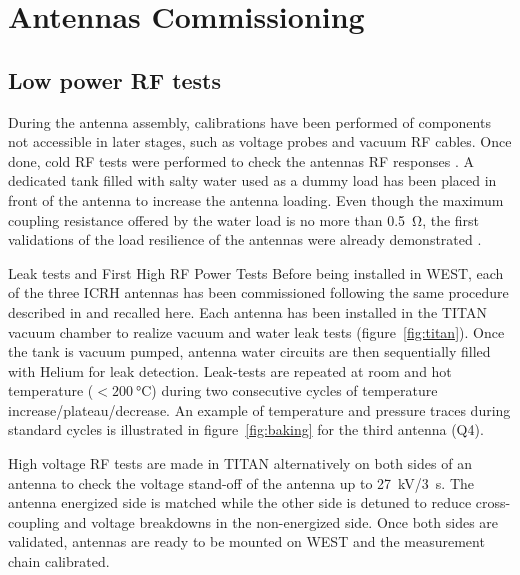 \documentclass[12p]{iopart}
\begin{document}
\section{Antennas Commissioning}
\subsection{Low power RF tests}
During the antenna assembly, calibrations have been performed of components not accessible in later stages, such as voltage probes and vacuum RF cables. Once done, cold RF tests were performed to check the antennas RF responses \cite{bernard2019, helou2020}. A dedicated tank filled with salty water used as a dummy load has been placed in front of the antenna to increase the antenna loading. Even though the maximum coupling resistance offered by the water load is no more than \SI{0.5}{\ohm}, the first validations of the load resilience of the antennas were already demonstrated \cite{helou2020}. 

Leak tests and First High RF Power Tests
Before being installed in WEST, each of the three ICRH antennas has been commissioned following the same procedure described in \cite{bernard2019} and recalled here. Each antenna has been installed in the TITAN vacuum chamber \cite{litaudon2013} to realize vacuum and water leak tests (figure~\ref{fig:titan}). Once the tank is vacuum pumped, antenna water circuits are then sequentially filled with Helium for leak detection. Leak-tests are repeated at room and hot temperature ($<\SI{200}{\celsius}$) during two consecutive cycles of temperature increase/plateau/decrease. An example of temperature and pressure traces during standard cycles is illustrated in figure~\ref{fig:baking} for the third antenna (Q4).  

High voltage RF tests are made in TITAN alternatively on both sides of an antenna to check the voltage stand-off of the antenna up to \SI{27}{\kilo\volt}/\SI{3}{\second}. The antenna energized side is matched while the other side is detuned to reduce cross-coupling and voltage breakdowns in the non-energized side. Once both sides are validated, antennas are ready to be mounted on WEST and the measurement chain calibrated.
\end{document}
